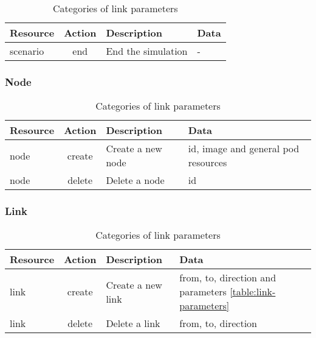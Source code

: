 \begin{table}[H]
  \centering
  \begin{tabular}{|l|c|l|l|}
    \hline
    Resource & Action & Description        & Data \\
    \hline\hline
    scenario & end    & End the simulation & -    \\
    \hline
  \end{tabular}
  \caption{Categories of link parameters}
  \label{table:events-scenario}
\end{table}

\subsubsection{Node}

\begin{table}[H]
  \centering
  \begin{tabular}{|l|c|l|l|}
    \hline
    Resource & Action & Description       & Data                                \\
    \hline\hline
    node     & create & Create a new node & id, image and general pod resources \\
    node     & delete & Delete a node     & id                                  \\
    \hline
  \end{tabular}
  \caption{Categories of link parameters}
  \label{table:events-node}
\end{table}


\subsubsection{Link}

\begin{table}[H]
  \centering
  \begin{tabular}{|l|c|l|l|}
    \hline
    Resource & Action & Description       & Data                                                           \\
    \hline\hline
    link     & create & Create a new link & from, to, direction and parameters \ref{table:link-parameters} \\
    link     & delete & Delete a link     & from, to, direction                                            \\
    \hline
  \end{tabular}
  \caption{Categories of link parameters}
  \label{table:events-link}
\end{table}
